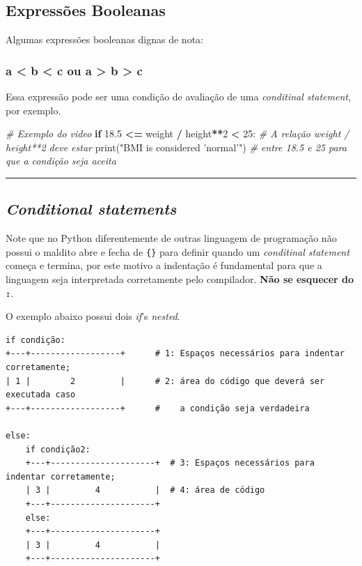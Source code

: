 \documentclass[]{book}
\newenvironment{Shaded}{\begin{snugshade}}{\end{snugshade}}
\newcommand{\DecValTok}[1]{\textcolor[rgb]{0.00,0.00,0.81}{#1}}
\newcommand{\FloatTok}[1]{\textcolor[rgb]{0.00,0.00,0.81}{#1}}
\newcommand{\StringTok}[1]{\textcolor[rgb]{0.31,0.60,0.02}{#1}}
\newcommand{\CommentTok}[1]{\textcolor[rgb]{0.56,0.35,0.01}{\textit{#1}}}
\newcommand{\ControlFlowTok}[1]{\textcolor[rgb]{0.13,0.29,0.53}{\textbf{#1}}}
\newcommand{\OperatorTok}[1]{\textcolor[rgb]{0.81,0.36,0.00}{\textbf{#1}}}
\newcommand{\BuiltInTok}[1]{#1}
\newcommand{\NormalTok}[1]{#1}
\begin{document}
\subsection{Expressões Booleanas}\label{expressoes-booleanas}

Algumas expressões booleanas dignas de nota:

\subsubsection{a \textless{} b \textless{} c ou a \textgreater{} b
\textgreater{} c}\label{a-b-c-ou-a-b-c}

Essa expressão pode ser uma condição de avaliação de uma
\emph{conditinal statement}, por exemplo.

\begin{Shaded}
\begin{Highlighting}[]
\CommentTok{# Exemplo do video}
\ControlFlowTok{if} \FloatTok{18.5} \OperatorTok{<=}\NormalTok{ weight }\OperatorTok{/}\NormalTok{ height}\OperatorTok{**}\DecValTok{2} \OperatorTok{<} \DecValTok{25}\NormalTok{:       }\CommentTok{# A relação weight / height**2 deve estar}
    \BuiltInTok{print}\NormalTok{(}\StringTok{"BMI is considered 'normal'"}\NormalTok{)   }\CommentTok{# entre 18.5 e 25 para que a condição seja aceita}
\end{Highlighting}
\end{Shaded}

\begin{center}\rule{0.5\linewidth}{\linethickness}\end{center}

\subsection{\texorpdfstring{\emph{Conditional
statements}}{Conditional statements}}\label{conditional-statements}

Note que no Python diferentemente de outras linguagem de programação não
possui o maldito abre e fecha de \texttt{\{\}} para definir quando um
\emph{conditinal statement} começa e termina, por este motivo a
indentação é fundamental para que a linguagem seja interpretada
corretamente pelo compilador. \textbf{Não se esquecer do \texttt{:}}.

O exemplo abaixo possui dois \emph{if}'s \emph{nested}.

\begin{verbatim}
if condição:
+---+------------------+      # 1: Espaços necessários para indentar corretamente;
| 1 |        2         |      # 2: área do código que deverá ser executada caso
+---+------------------+      #    a condição seja verdadeira

else:
    if condição2:
    +---+---------------------+  # 3: Espaços necessários para indentar corretamente;
    | 3 |         4           |  # 4: área de código
    +---+---------------------+
    else:
    +---+---------------------+
    | 3 |         4           |
    +---+---------------------+
\end{verbatim}
\end{document}
